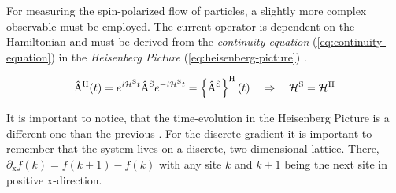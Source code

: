 
For measuring the spin-polarized flow of particles, a slightly more complex observable must be employed. 
The current operator is dependent on the Hamiltonian and must be derived from the \emph{continuity equation} (\autoref{eq:continuity-equation}) in the \emph{Heisenberg Picture} (\autoref{eq:heisenberg-picture}) \cite{discreteDivergenceAndOtherCurrentDerivation}.

\begin{equation}
    \label{eq:heisenberg-picture}
    \begin{split}
        \AopOfT[\heisenbergPicture] &= e^{i \pictureHamiltonian[\schroedingerPicture]{} t} \Aop[\schroedingerPicture] e^{-i \pictureHamiltonian[\schroedingerPicture]{} t}
        =  \heisenbergTimeEvolution{\Aop[\schroedingerPicture]}
        \quad \Rightarrow \quad 
        \pictureHamiltonian[\schroedingerPicture]{} = \pictureHamiltonian[\heisenbergPicture]{}\\
    \end{split}
\end{equation}

It is important to notice, that the time-evolution in the Heisenberg Picture \heisenbergTimeEvolution{\ast} is a different one than the previous \interactionTimeEvolution{\ast}.
For the discrete gradient \discreteGradient it is important to remember that the system lives on a discrete, two-dimensional lattice.
There, $\partial_\text{x} f(k) = f(k+1) - f(k)$ with any site $k$ and $k+1$ being the \glqq{}next\grqq{} site in positive $\text{x}$-direction.

